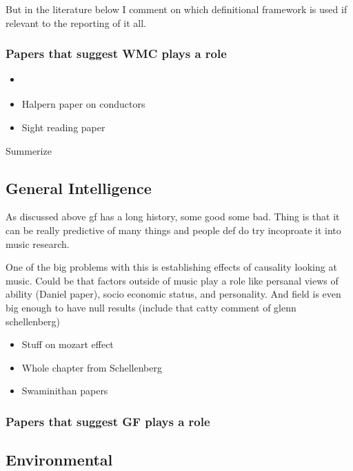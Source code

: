 \documentclass[]{book}
\providecommand{\tightlist}{%
  \setlength{\itemsep}{0pt}\setlength{\parskip}{0pt}}
\theoremstyle{definition}
\theoremstyle{definition}
\theoremstyle{definition}
\theoremstyle{remark}
\begin{document}
But in the literature below I comment on which definitional framework is
used if relevant to the reporting of it all.

\hypertarget{papers-that-suggest-wmc-plays-a-role}{%
\subsubsection{Papers that suggest WMC plays a
role}\label{papers-that-suggest-wmc-plays-a-role}}

\begin{itemize}
\tightlist
\item
  \citep{nicholsScoreOneJazz2018}
\item
  Halpern paper on conductors
\item
  Sight reading paper
\end{itemize}

Summerize

\hypertarget{general-intelligence}{%
\subsection{General Intelligence}\label{general-intelligence}}

As discussed above gf has a long history, some good some bad. Thing is
that it can be really predictive of many things and people def do try
incoproate it into music research.

One of the big problems with this is establishing effects of causality
looking at music. Could be that factors outside of music play a role
like persanal views of ability (Daniel paper), socio economic status,
and personality. And field is even big enough to have null results
(include that catty comment of glenn schellenberg)

\begin{itemize}
\tightlist
\item
  Stuff on mozart effect
\item
  Whole chapter from Schellenberg
\item
  Swaminithan papers
\end{itemize}

\hypertarget{papers-that-suggest-gf-plays-a-role}{%
\subsubsection{Papers that suggest GF plays a
role}\label{papers-that-suggest-gf-plays-a-role}}

\hypertarget{environmental}{%
\subsection{Environmental}\label{environmental}}
\end{document}
